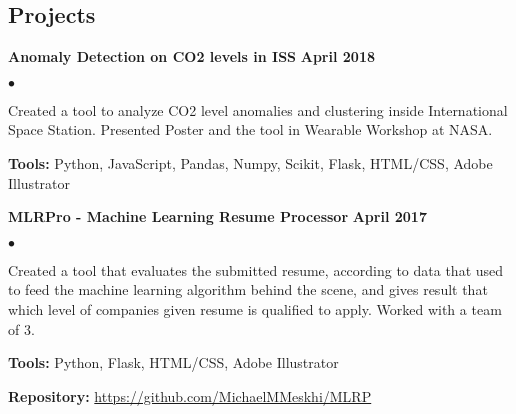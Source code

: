 \documentclass[margin,line]{res}
\newenvironment{list2}{
  \begin{list}{$\bullet$}{%
      \setlength{\itemsep}{0in}
      \setlength{\parsep}{0in} \setlength{\parskip}{0in}
      \setlength{\topsep}{0in} \setlength{\partopsep}{0in} 
      \setlength{\leftmargin}{0.2in}}}{\end{list}}
\begin{document}
\begin{resume}

%

%



\section{\sc Projects}

{\bf Anomaly Detection on CO2 levels in ISS} \hfill {\bf April 2018}\\
\vspace{-.3cm}
\begin{list2}
\item Created a tool to analyze CO2 level anomalies and clustering inside International Space Station. Presented Poster and the tool in Wearable Workshop at NASA.
\item \textbf{Tools:} Python, JavaScript, Pandas, Numpy, Scikit, Flask, HTML/CSS, Adobe Illustrator
\end{list2}


{\bf MLRPro - Machine Learning Resume Processor} \hfill {\bf April 2017}\\
\vspace{-.3cm}
\begin{list2}
\item Created a tool that evaluates the submitted resume, according to data that used to feed the machine learning algorithm behind the scene, and gives result that which level of companies given resume is qualified to apply. Worked with a team of 3.
\item \textbf{Tools:} Python, Flask, HTML/CSS, Adobe Illustrator
\item \textbf{Repository:} \href{https://github.com/MichaelMMeskhi/MLRP}{https://github.com/MichaelMMeskhi/MLRP}
\end{list2}


\end{resume}
\end{document}
